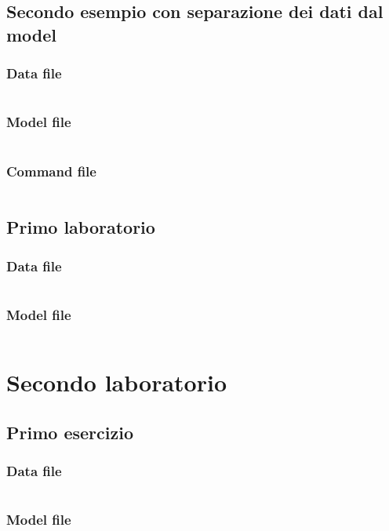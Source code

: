 \documentclass[\main/main.tex]{subfiles}
\begin{document}
\subsection{Secondo esempio con separazione dei dati dal model}
\subsubsection{Data file}
\inputminted{ampl}{\main/chapters/ampl/es2/example2.dat}
\subsubsection{Model file}
\inputminted{ampl}{\main/chapters/ampl/es2/example2.mod}
\subsubsection{Command file}
\inputminted{ampl}{\main/chapters/ampl/es2/example2.run}

\subsection{Primo laboratorio}
\subsubsection{Data file}
\inputminted{ampl}{\main/chapters/ampl/steel/steel.dat}
\subsubsection{Model file}
\inputminted{ampl}{\main/chapters/ampl/steel/steel.mod}

\clearpage

\section{Secondo laboratorio}
\subsection{Primo esercizio}
\subsubsection{Data file}
\inputminted{ampl}{\main/chapters/ampl/transp/transp.dat}
\subsubsection{Model file}
\inputminted{ampl}{\main/chapters/ampl/transp/transp.mod}
\end{document}
